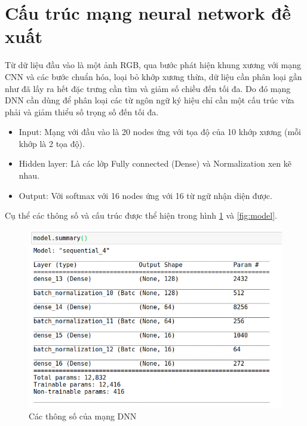 \section{Cấu trúc mạng neural network đề xuất}
Từ dữ liệu đầu vào là một ảnh RGB, qua bước phát hiện khung xương với mạng CNN và các bước chuẩn hóa, loại bỏ khớp xương thừa, dữ liệu cần phân loại gần như đã lấy ra hết đặc trưng cần tìm và giảm số chiều đến tối đa. Do đó mạng DNN cần dùng để phân loại các từ ngôn ngữ ký hiệu chỉ cần một cấu trúc vừa phải và giảm thiểu số trọng số đến tối đa.
\begin{itemize}
\item Input: Mạng với đầu vào là 20 nodes ứng với tọa độ của 10 khớp xương (mỗi khớp là 2 tọa độ).
\item Hidden layer: Là các lớp Fully connected (Dense) và Normalization xen kẽ nhau.
\item Output: Với softmax với 16 nodes ứng với 16 từ ngữ nhận diện được.
\end{itemize}
Cụ thể các thông số và cấu trúc được thể hiện trong hình \ref{fig:model_params} và \ref{fig:model}.

\FloatBarrier
\begin{figure}[htp]
\begin{center}
\includegraphics[scale=1.3]{chap4/c4_figs/model_param.png}
\end{center}
\caption{Các thông số của mạng DNN}
\label{fig:model_params}
\end{figure}
\FloatBarrier

